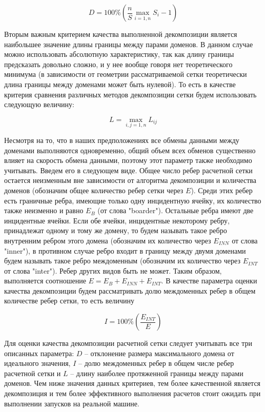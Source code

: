 \documentclass[
11pt,%
tightenlines,%
twoside,%
onecolumn,%
nofloats,%
nobibnotes,%
nofootinbib,%
superscriptaddress,%
noshowpacs,%
centertags]%
{revtex4}
\begin{document}
\begin{equation}
D = 100 \% \left( \frac{n}{S} \max_{i=1,n}{S_i} - 1 \right)
\end{equation}

Вторым важным критерием качества выполненной декомпозиции является наибольшее значение длины границы между парами доменов.
В данном случае можно использовать абсолютную характеристику, так как длину границы предсказать довольно сложно, и у нее вообще говоря нет теоретического минимума (в зависимости от геометрии рассматриваемой сетки теоретически длина границы между доменами может быть нулевой).
То есть в качестве критерия сравнения различных методов декомпозиции сетки будем использовать следующую величину:

\begin{equation}
L = \max_{i,j=1,n}{L_{ij}}
\end{equation}

Несмотря на то, что в наших предположениях все обмены данными между доменами выполняются одновременно, общий объем всех обменов существенно влияет на скорость обмена данными, поэтому этот параметр также необходимо учитывать.
Введем его в следующем виде.
Общее число ребер расчетной сетки остается неизменным вне зависимости от алгоритма декомпозиции и количества доменов (обозначим общее количество ребер сетки через $E$).
Среди этих ребер есть граничные ребра, имеющие только одну инцидентную ячейку, их количество также неизменно и равно $E_B$ (от слова "boarder").
Остальные ребра имеют две инцидентные ячейки.
Если обе ячейки, инцидентные некоторому ребру, принадлежат одному и тому же домену, то будем называть такое ребро внутренним ребром этого домена (обозначим их количество через $E_{INN}$ от слова "inner"), в противном случае ребро входит в границу между двумя доменами будем называть такое ребро междоменным (обозначим их количество через $E_{INT}$ от слова "inter").
Ребер других видов быть не может.
Таким образом, выполняется соотношение $E = E_B + E_{INN} + E_{INT}$.
В качестве параметра оценки качества декомпозиции будем рассматривать долю междоменных ребер в общем количестве ребер сетки, то есть величину

\begin{equation}
I = 100 \% \left( \frac{E_{INT}}{E} \right)
\end{equation}
	  
Для оценки качества декомпозиции расчетной сетки следует учитывать все три описанных параметра: $D$ -- отклонение размера максимального домена от идеального значения, $I$ -- долю междоменных ребер в общем числе ребер расчетной сетки и $L$ -- длину наиболее протяженной границы между парами доменов.
Чем ниже значения данных критериев, тем более качественной является декомпозиция и тем более эффективного выполнения расчетов стоит ожидать при выполнении запусков на реальной машине.
\end{document}
